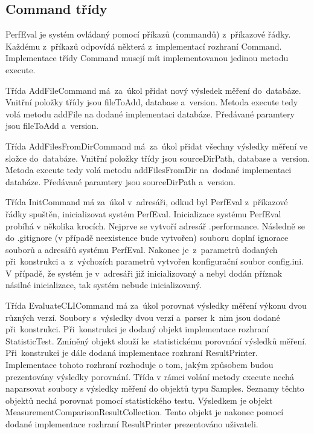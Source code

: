 \subsection{Command třídy}

PerfEval je systém ovládaný pomocí příkazů (commandů) z~příkazové řádky. Každému z~příkazů
odpovídá některá z~implementací rozhraní Command. Implementace třídy Command musejí mít implementovanou
jedinou metodu execute.

Třída AddFileCommand má~za~úkol přidat nový výsledek měření do~databáze. Vnitřní položky
třídy jsou fileToAdd, database a~version. Metoda execute tedy volá metodu addFile na dodané implementaci
databáze. Předávané paramtery jsou fileToAdd a~version.

Třída AddFilesFromDirCommand má~za~úkol přidat všechny výsledky měření ve složce do~databáze. Vnitřní položky
třídy jsou sourceDirPath, database a~version. Metoda execute tedy volá metodu addFilesFromDir na~dodané implementaci
databáze. Předávané paramtery jsou sourceDirPath a~version.

Třída InitCommand má za~úkol v~adresáři, odkud byl PerfEval z~příkazové řádky spuštěn, inicializovat systém PerfEval.
Inicializace systému PerfEval probíhá v několika krocích. Nejprve se vytvoří adresář .performance. Následně se do .gitignore
(v případě neexistence bude vytvořen) souboru doplní ignorace souborů a adresářů systému PerfEval. Nakonec je~z~parametrů
dodaných při~konstrukci a~z~výchozích parametrů vytvořen konfigurační soubor config.ini. V případě, že systém je
v~adresáři již inicializovaný a nebyl dodán příznak násilné inicializace, tak systém nebude inicializovaný.

Třída EvaluateCLICommand má za~úkol porovnat výsledky měření výkonu dvou různých verzí.
Soubory s~výsledky dvou verzí a~parser k~nim jsou dodané při~konstrukci. Při~konstrukci
je dodaný objekt implementace rozhraní StatisticTest. Zmíněný objekt slouží ke~statistickému
porovnání výsledků měření. Při~konstrukci je dále dodaná implementace rozhraní ResultPrinter.
Implementace tohoto rozhraní rozhoduje o tom, jakým způsobem budou prezentovány výsledky porovnání.
Třída v rámci volání metody execute nechá naparsovat soubory s výsledky měření do objektů typu Samples.
Seznamy těchto objektů nechá porovnat pomocí statistického testu. Výsledkem je objekt MeasurementComparisonResultCollection.
Tento objekt je nakonec pomocí dodané implementace rozhraní ResultPrinter prezentováno uživateli.

